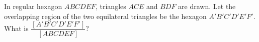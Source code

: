 In regular hexagon $ABCDEF$, triangles $ACE$ and $BDF$ are drawn. Let the overlapping region of the two equilateral triangles be the hexagon $A'B'C'D'E'F'$. What is $\dfrac{[A'B'C'D'E'F']}{[ABCDEF]}$?
